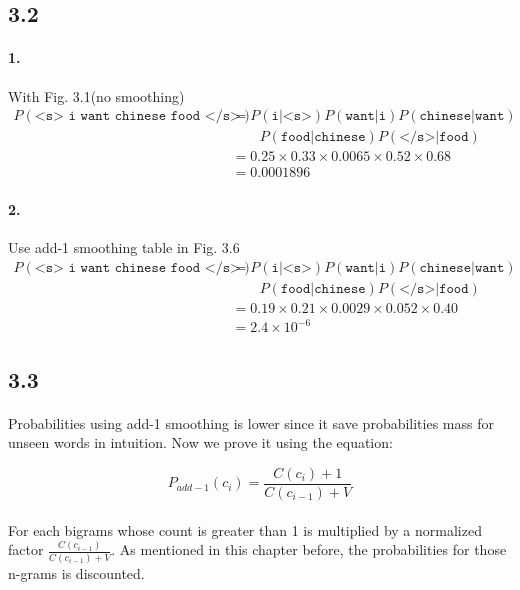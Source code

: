 \documentclass{article}
\begin{document}
\subsection*{3.2}

\paragraph{1.}
With Fig. 3.1(no smoothing)
\begin{align*}
    P(\texttt{<s> i want chinese food </s>})
     & = P(\texttt{i|<s>}) P(\texttt{want|i}) P(\texttt{chinese|want}) \\
     & \qquad P(\texttt{food|chinese}) P(\texttt{</s>|food})           \\
     & = 0.25 \times 0.33 \times 0.0065 \times 0.52 \times 0.68        \\
     & = 0.0001896
\end{align*}

\paragraph{2.}
Use add-1 smoothing table in Fig. 3.6
\begin{align*}
    P(\texttt{<s> i want chinese food </s>})
     & = P(\texttt{i|<s>}) P(\texttt{want|i})P(\texttt{chinese|want}) \\
     & \qquad P(\texttt{food|chinese}) P(\texttt{</s>|food})          \\
     & = 0.19 \times 0.21 \times 0.0029 \times 0.052 \times 0.40      \\
     & = 2.4 \times 10^{-6}
\end{align*}

\subsection*{3.3}

\paragraph{}
Probabilities using add-1 smoothing is lower since it save probabilities
mass for unseen words in intuition. Now we prove it using the equation:

$$P_{add-1}(c_i) = \displaystyle\frac{C(c_i) + 1}{C(c_{i-1}) + V}$$

\paragraph{}
For each bigrams whose count is greater than 1 
is multiplied by a normalized factor $\displaystyle\frac{C(c_{i-1})}{C(c_{i-1}) + V}$.
As mentioned in this chapter before, the probabilities for those n-grams is discounted.
\end{document}
